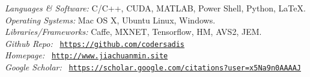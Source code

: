 \documentclass[margin, 10pt]{res} %
\begin{document}
\begin{resume}
{\sl Languages \& Software:}
C/C++, CUDA, MATLAB, Power Shell, Python, \LaTeX. \\
{\sl Operating Systems:}
Mac OS X, Ubuntu Linux, Windows. \\
{\sl Libraries/Frameworks:}
Caffe, MXNET, Tensorflow, HM, AVS2, JEM. \\
{\sl Github Repo:}
\Pickup~{\href{https://github.com/codersadis}{\texttt{https://github.com/codersadis}}} \\
{\sl Homepage:}
\Pickup~{\href{http://http:www.jiachuanmin.site}{\texttt{http://www.jiachuanmin.site}}} \\
{\sl Google Scholar:}
\Pickup~{\href{https://scholar.google.com/citations?user=x5Na9n0AAAAJ}{\texttt{https://scholar.google.com/citations?user=x5Na9n0AAAAJ}}} \\



%



\end{resume}
\end{document}
